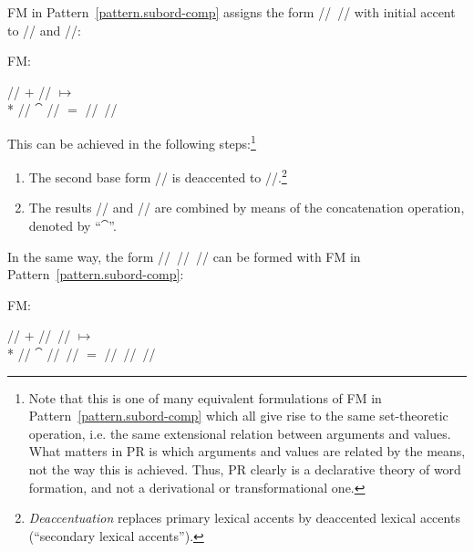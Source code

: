\documentclass[output=paper
  ,nobabel
  ,draftmode
  ,colorlinks, citecolor=brown
]{langscibook}
\begin{document}
\noindent
FM in Pattern \ref{pattern.subord-comp}
assigns the form // // with initial accent to // and //: \begin{exe}
\ex \raggedright
\begin{labeledlist}{FM:}
\item[FM:] \raggedright // $+$ // $↦$\\*{}
// $⁀$ // $=$ // //
\end{labeledlist}
\end{exe} 
This can be achieved in the following steps:\footnote{\label{note.extensionality}Note that this is one of many equivalent formulations
of FM in Pattern \ref{pattern.subord-comp} which all
give rise to the same set-theoretic operation, i.e. the same extensional
relation between arguments and values. What matters in PR is which arguments and
values are related by the means, not the way this is achieved. Thus, PR clearly
is a declarative theory of word formation, and not a derivational or
transformational one.} \begin{enumerate}
\item{} The second base form // is deaccented to //.\footnote{\emph{Deaccentuation} replaces
primary lexical accents by deaccented lexical accents (``secondary
lexical accents'').}
\item{} The results //
and // are combined by
means of the concatenation operation, denoted by ``$⁀$''.
\end{enumerate} In the same way, the form // // // can be formed with FM in Pattern \ref{pattern.subord-comp}: \begin{exe}
\ex \raggedright
\begin{labeledlist}{FM:}
\item[FM:] \raggedright // $+$ // // $↦$\\*{}
// $⁀$ // // $=$ // // //
\end{labeledlist}
\end{exe}
\end{document}
